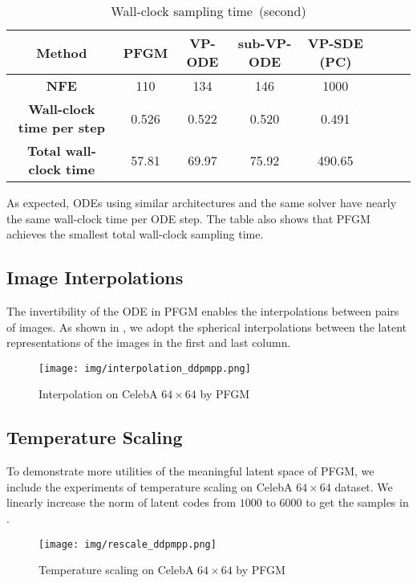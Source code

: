 \begin{table*}[htb]
\begin{center}
\caption{Wall-clock sampling time~(second)}
\label{table:wall-clock}
\begin{tabular}{c c c c c c c c}
		\toprule
		\textbf{Method} &  PFGM &VP-ODE& sub-VP-ODE& VP-SDE (PC)\\
		\midrule
        \textbf{NFE} & 110 & 134 &146 & 1000\\
		\midrule
        \textbf{Wall-clock time per step} & 0.526 & 0.522 &0.520 & 0.491\\
		\midrule
        \textbf{Total wall-clock time} & 57.81 & 69.97 &75.92&490.65\\
        \bottomrule
\end{tabular}
\end{center}
\end{table*}

As expected, ODEs using similar architectures and the same solver have nearly the same wall-clock time per ODE step. The table also shows that PFGM achieves the smallest total wall-clock sampling time. 

\subsection{Image Interpolations}
\label{app:interpolate}

The invertibility of the ODE in PFGM enables the interpolations between pairs of images. As shown in , we adopt the spherical interpolations between the latent representations of the images in the first and last column.

\begin{figure}[htbp]
    \centering
    \texttt{[image: img/interpolation\_ddpmpp.png]}
     \caption{Interpolation on CelebA $64\times 64$ by PFGM}\label{fig:interpolation}
\end{figure}

\subsection{Temperature Scaling}
\label{app:temp}

To demonstrate more utilities of the meaningful latent space of PFGM, we include the experiments of temperature scaling on CelebA $64 \times 64$ dataset. We linearly increase the norm of latent codes from $1000$ to $6000$ to get the samples in .
\begin{figure}[htbp]
    \centering
    \texttt{[image: img/rescale\_ddpmpp.png]}
    \caption{Temperature scaling on CelebA $64 \times 64$ by PFGM}
    \label{fig:temperature}
\end{figure}

